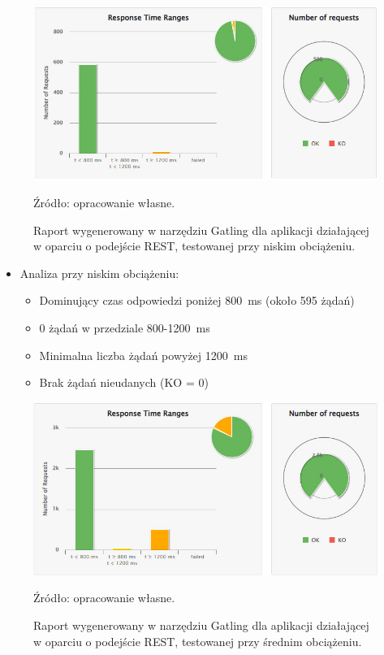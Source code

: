 \documentclass[runningheads,12pt]{llncs}
\begin{document}
\begin{figure}
    \includegraphics[width=\linewidth]{images/rest-gatling-low-graph.jpg}
    \caption{Raport wygenerowany w narzędziu Gatling dla aplikacji działającej w oparciu o podejście REST, testowanej przy niskim obciążeniu.} \label{fig1}
    \vspace{0.5em}
    {\small Źródło: opracowanie własne.}
\end{figure}

\begin{itemize}
  \item Analiza przy niskim obciążeniu:
  \begin{itemize}
    \item Dominujący czas odpowiedzi poniżej 800~ms (około 595 żądań)
    \item 0 żądań w przedziale 800-1200~ms
    \item Minimalna liczba żądań powyżej 1200~ms
    \item Brak żądań nieudanych (KO = 0)
  \end{itemize}
\end{itemize}

\newpage

\begin{figure}
    \includegraphics[width=\linewidth]{images/rest-gatling-moddle-rest.jpg}
    \caption{Raport wygenerowany w narzędziu Gatling dla aplikacji działającej w oparciu o podejście REST, testowanej przy średnim obciążeniu.} \label{fig2}
    \vspace{0.5em}
    {\small Źródło: opracowanie własne.}
\end{figure}
\end{document}
